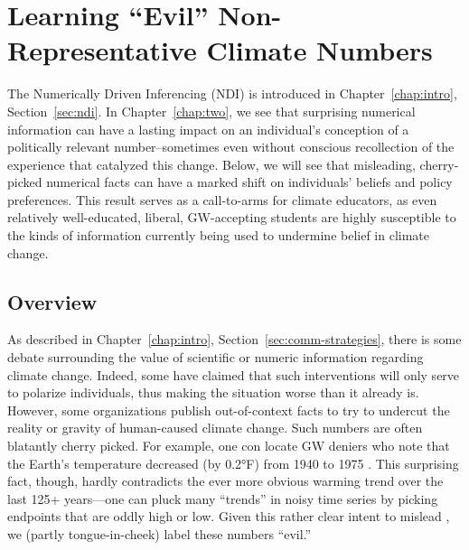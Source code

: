\graphicspath{{evil-ndi/}}

\chapter{Learning \texorpdfstring{``Evil''}{"Evil"} Non-Representative Climate Numbers}
\label{chap:evilndi}

The Numerically Driven Inferencing (NDI) is introduced in
Chapter~\ref{chap:intro}, Section~\ref{sec:ndi}. In Chapter~\ref{chap:two}, we
see that surprising numerical information can have a lasting impact on an
individual's conception of a politically relevant number--sometimes even without
conscious recollection of the experience that catalyzed this change.  Below, we
will see that misleading, cherry-picked numerical facts can have a marked shift
on individuals' beliefs and policy preferences. This result serves as a
call-to-arms for climate educators, as even relatively well-educated, liberal,
GW-accepting students are highly susceptible to the kinds of information
currently being used to undermine belief in climate change.

\section{Overview}

As described in Chapter~\ref{chap:intro}, Section~\ref{sec:comm-strategies},
there is some debate surrounding the value of scientific or numeric information
regarding climate change. Indeed, some have claimed that such interventions will
only serve to polarize individuals, thus making the situation worse than it
already is. However, some organizations publish out-of-context facts to try to
undercut the reality or gravity of human-caused climate change. Such numbers are
often blatantly cherry picked. For example, one con locate GW deniers who note
that the Earth’s temperature decreased (by 0.2°F) from 1940 to 1975
\parencite{jastrow_global_1991}. This surprising fact, though, hardly
contradicts the ever more obvious warming trend over the last 125+ years---one
can pluck many ``trends'' in noisy time series by picking endpoints that are
oddly high or low. Given this rather clear intent to mislead
\parencite[corroborated by][]{oreskes_merchants_2010}, we (partly
tongue-in-cheek) label these numbers ``evil.'' 

